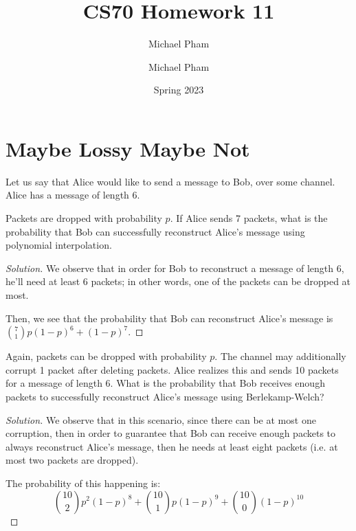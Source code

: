 \documentclass{article}
\title{#1}
\author{Michael Pham}
\date{#2}
\newenvironment{solution}{\begin{proof}[Solution]}{\end{proof}}
\newcommand{\mytitle}[2]{%
	\title{#1}
	\author{Michael Pham}
	\date{#2}
	\maketitle
	\newpage
	\tableofcontents
	\newpage
}
\begin{document}
\mytitle{CS70 Homework 11}{Spring 2023}

\section{Maybe Lossy Maybe Not}
Let us say that Alice would like to send a message to Bob, over some channel. Alice has a message of length 6.
\begin{hw}
	Packets are dropped with probability $p$. If Alice sends 7 packets, what is the probability that Bob can successfully reconstruct Alice's message using polynomial interpolation.
\end{hw}
\begin{solution}
	We observe that in order for Bob to reconstruct a message of length 6, he'll need at least 6 packets; in other words, one of the packets can be dropped at most.
	
	Then, we see that the probability that Bob can reconstruct Alice's message is $\binom{7}{1}p(1-p)^{6} + (1-p)^{7}$.
\end{solution}

\begin{hw}
	Again, packets can be dropped with probability $p$. The channel may additionally corrupt 1 packet after deleting packets. Alice realizes this and sends 10 packets for a message of length 6. What is the probability that Bob receives enough packets to successfully reconstruct Alice's message using Berlekamp-Welch?
\end{hw}
\begin{solution}
	We observe that in this scenario, since there can be at most one corruption, then in order to guarantee that Bob can receive enough packets to always reconstruct Alice's message, then he needs at least eight packets (i.e. at most two packets are dropped).
	
	The probability of this happening is:
	\begin{equation*}
		\binom{10}{2}p^{2}(1-p)^{8} + \binom{10}{1}p(1-p)^{9} + \binom{10}{0}(1-p)^{10}
	\end{equation*}
\end{solution}
\end{document}
